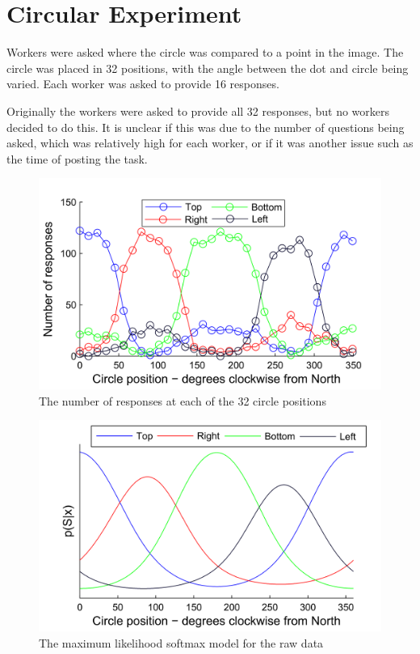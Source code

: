 \chapter{Circular Experiment}

Workers were asked where the circle was compared to a point in the image. The circle was placed in 32 positions, with the angle between the dot and circle being varied. Each worker was asked to provide 16 responses.

Originally the workers were asked to provide all 32 responses, but no workers decided to  do this. It is unclear if this was due to the number of questions being asked, which was relatively high for each worker, or if it was another issue such as the time of posting the task. 




\begin{figure}
	\centering
	\includegraphics[scale=1]{line_circular_raw_data.png}
	\caption{The number of responses at each of the 32 circle positions}
	\label{Figure:circular_raw_responses}
\end{figure}

\begin{figure}
	\centering
	\includegraphics[scale=1]{line_circular_raw_data_softmax.png}
	\caption{The maximum likelihood softmax model for the raw data}
	\label{Figure:cicular_raw_softmax_model_all_responses}
\end{figure}




